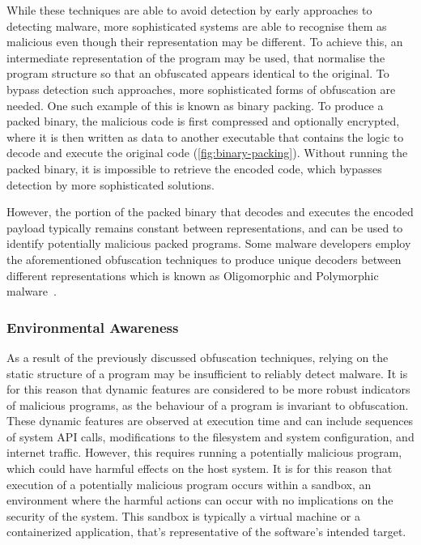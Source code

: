 \documentclass{report}
\begin{document}
While these techniques are able to avoid detection by early approaches to detecting malware, more sophisticated systems are able to recognise them as malicious even though their representation may be different. To achieve this, an intermediate representation of the program may be used, that normalise the program structure so that an obfuscated appears identical to the original. To bypass detection such approaches, more sophisticated forms of obfuscation are needed. One such example of this is known as binary packing. To produce a packed binary, the malicious code is first compressed and optionally encrypted, where it is then written as data to another executable that contains the logic to decode and execute the original code (\autoref{fig:binary-packing}). Without running the packed binary, it is impossible to retrieve the encoded code, which bypasses detection by more sophisticated solutions. 

However, the portion of the packed binary that decodes and executes the encoded payload typically remains constant between representations, and can be used to identify potentially malicious packed programs. Some malware developers employ the aforementioned obfuscation techniques to produce unique decoders between different representations which is known as Oligomorphic and Polymorphic malware~\citep{youMalwareObfuscationTechniques2010}. 

\subsubsection{Environmental Awareness}

As a result of the previously discussed obfuscation techniques, relying on the static structure of a program may be insufficient to reliably detect malware. It is for this reason that dynamic features are considered to be more robust indicators of malicious programs, as the behaviour of a program is invariant to obfuscation. These dynamic features are observed at execution time and can include sequences of system API calls, modifications to the filesystem and system configuration, and internet traffic. However, this requires running a potentially malicious program, which could have harmful effects on the host system. It is for this reason that execution of a potentially malicious program occurs within a sandbox, an environment where the harmful actions can occur with no implications on the security of the system. This sandbox is typically a virtual machine or a containerized application, that's representative of the software's intended target. 
\end{document}
